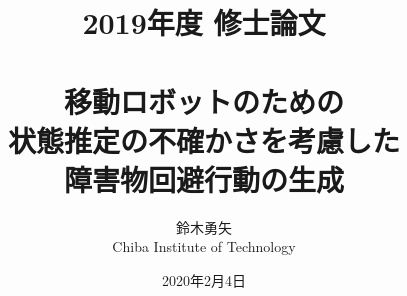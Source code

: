 \documentclass[a4paper,12pt,uplatex]{jsbook}
\begin{document}
\title{2019年度 修士論文\\
　\\
移動ロボットのための\\
状態推定の不確かさを考慮した\\
障害物回避行動の生成}
\author{鈴木勇矢\\
Chiba Institute of Technology}
\date{2020年2月4日}

\maketitle


\tableofcontents

\cleardoublepage
{}

% 
% 
% 
% 
% 
% 











\newpage
\end{document}
